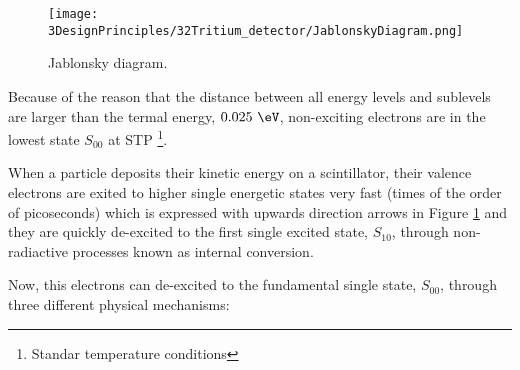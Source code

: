 \begin{figure}[htbp]
\centering
\texttt{[image: 3DesignPrinciples/32Tritium\_detector/JablonskyDiagram.png]}
\caption{Jablonsky diagram.\label{fig:JablonskyDiagram}~\cite{Knoll}}
\end{figure}

Because of the reason that the distance between all energy levels and sublevels are larger than the termal energy, $0.025~\eV$, non-exciting electrons are in the lowest state $S_{00}$ at STP \footnote{Standar temperature conditions}.

When a particle deposits their kinetic energy on a scintillator, their valence electrons are exited to higher single energetic states very fast (times of the order of picoseconds) which is expressed with upwards direction arrows in Figure \ref{fig:JablonskyDiagram} and they are quickly de-excited to the first single excited state, $S_{10}$, through non-radiactive processes known as internal conversion.

Now, this electrons can de-excited to the fundamental single state, $S_{00}$, through three different physical mechanisms:

